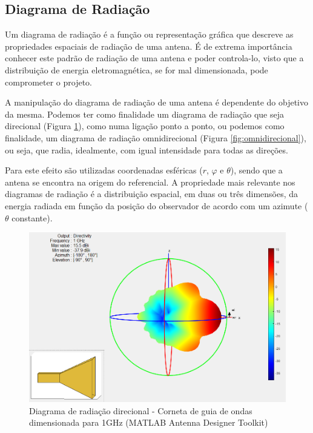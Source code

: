 \subsection*{Diagrama de Radiação}
Um diagrama de radiação é a função ou representação gráfica que descreve as propriedades espaciais de radiação de uma antena. É de extrema importância conhecer este padrão de radiação de uma antena e poder controla-lo, visto que a distribuição de energia eletromagnética, se for mal dimensionada, pode comprometer o projeto. \par 

A manipulação do diagrama de radiação de uma antena é dependente do objetivo da mesma. Podemos ter como finalidade um diagrama de radiação que seja direcional (Figura \ref{fig:direcional}), como numa ligação ponto a ponto, ou podemos como finalidade, um diagrama de radiação omnidirecional (Figura \ref{fig:omnidirecional}), ou seja, que radia, idealmente, com igual intensidade para todas as direções.\par

Para este efeito são utilizadas coordenadas esféricas ($r$, $\varphi$ e $\theta$), sendo que a antena se encontra na origem do referencial. A propriedade mais relevante nos diagramas de radiação é a distribuição espacial, em duas ou três dimensões, da energia radiada em função da posição do observador de acordo com um azimute ($\theta$ constante).\par 

\begin{figure}[h]
\centering
\includegraphics[scale=0.6]{chapters/ch3/assets/matlab_ad1}
\decoRule
\caption[Diagrama de radiação direcional]{Diagrama de radiação direcional - Corneta de guia de ondas dimensionada para 1GHz (MATLAB Antenna Designer Toolkit)}
\label{fig:direcional}
\end{figure}

